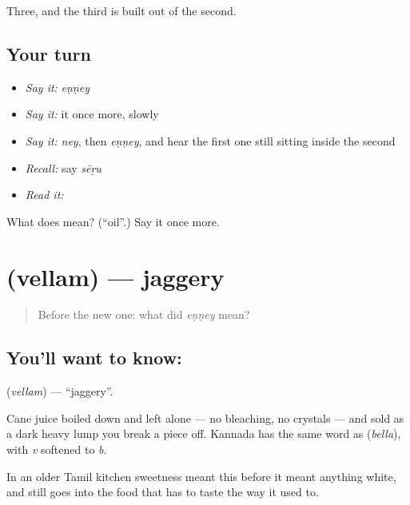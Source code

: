 \begin{grammarlens}[title={What you've built}]
Three, and the third is built out of the second.
\end{grammarlens}

\subsection*{Your turn}
\begin{itemize}
\raggedright
  \item \emph{Say it:} \emph{eṇṇey}
  \item \emph{Say it:} it once more, slowly
  \item \emph{Say it:} \emph{ney}, then \emph{eṇṇey}, and hear the first one still sitting inside the second
  \item \emph{Recall:} say \emph{sēṟu}
  \item \emph{Read it:} \textbf{}
\end{itemize}

\begin{tcolorbox}[breakable,colback=teal!4,colframe=teal!35!black,title={Before you move on}]
What does  mean? (\textquotedblleft{}oil\textquotedblright{}.) Say it once more.
\end{tcolorbox}
\section[\texorpdfstring{\ta{வெல்லம்} (vellam)}{வெல்லம் (vellam)}]{ (vellam) — jaggery}

\label{lesson:TA-C59-jaggery}



\begin{quote}
Before the new one: what did \emph{eṇṇey} mean?
\end{quote}

\subsection*{You'll want to know: }
\textbf{} (\emph{vellam}) — \textquotedblleft{}jaggery\textquotedblright{}.

Cane juice boiled down and left alone — no bleaching, no crystals — and sold as a dark heavy lump you break a piece off. Kannada has the same word as  (\emph{bella}), with \emph{v} softened to \emph{b}.

In an older Tamil kitchen sweetness meant this before it meant anything white, and  still goes into the food that has to taste the way it used to.

